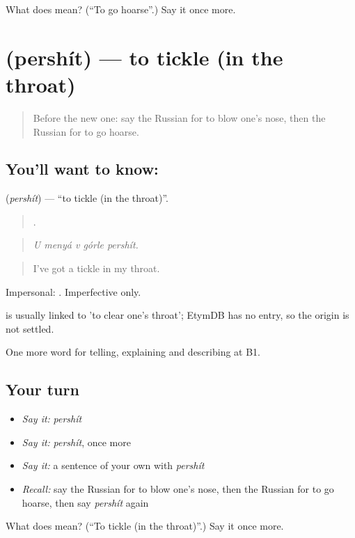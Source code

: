 \begin{tcolorbox}[breakable,colback=teal!4,colframe=teal!35!black,title={Before you move on}]
What does  mean? (\textquotedblleft{}To go hoarse\textquotedblright{}.) Say it once more.
\end{tcolorbox}
\section[\texorpdfstring{\ru{першить} (pershít)}{першить (pershít)}]{ (pershít) — to tickle (in the throat)}

\label{lesson:RU-C486-pershit}



\begin{quote}
Before the new one: say the Russian for to blow one's nose, then the Russian for to go hoarse.
\end{quote}

\subsection*{You'll want to know: }
\textbf{} (\emph{pershít}) — \textquotedblleft{}to tickle (in the throat)\textquotedblright{}.

\begin{quote}
    .
\end{quote}

\begin{quote}
\emph{U menyá v górle pershít.}
\end{quote}

\begin{quote}
I've got a tickle in my throat.
\end{quote}

Impersonal: \emph{  }. Imperfective only.

\begin{cousinweb}
\emph{} is usually linked to \emph{} 'to clear one's throat'; EtymDB has no entry, so the origin is not settled.
\end{cousinweb}

\begin{grammarlens}[title={What you've built}]
One more word for telling, explaining and describing at B1.
\end{grammarlens}

\subsection*{Your turn}
\begin{itemize}
\raggedright
  \item \emph{Say it:} \emph{pershít}
  \item \emph{Say it:} \emph{pershít}, once more
  \item \emph{Say it:} a sentence of your own with \emph{pershít}
  \item \emph{Recall:} say the Russian for to blow one's nose, then the Russian for to go hoarse, then say \emph{pershít} again
\end{itemize}

\begin{tcolorbox}[breakable,colback=teal!4,colframe=teal!35!black,title={Before you move on}]
What does  mean? (\textquotedblleft{}To tickle (in the throat)\textquotedblright{}.) Say it once more.
\end{tcolorbox}

